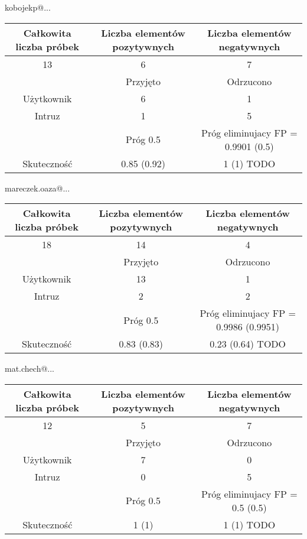 		kobojekp@... \\
		\begin{tabular}{|c|c|c|}
		\hline
		Całkowita liczba próbek & Liczba elementów pozytywnych & Liczba elementów negatywnych \\ \hline
			    	  13  & 6             & 7 \\ \hline
						    & Przyjęto   & Odrzucono \\ \hline
		Użytkownik  & 6             & 1 \\ \hline
		Intruz		    & 1             & 5 \\ \hline
						    & Próg 0.5  	& Próg eliminujacy FP = 0.9901 (0.5) \\ \hline
		Skuteczność & 0.85 (0.92)       & 1 (1) TODO\\ \hline
		\end{tabular}

		mareczek.oaza@... \\
		\begin{tabular}{|c|c|c|}
		\hline
		Całkowita liczba próbek & Liczba elementów pozytywnych & Liczba elementów negatywnych \\ \hline
			    	  18  & 14             & 4 \\ \hline
						    & Przyjęto   & Odrzucono \\ \hline
		Użytkownik  & 13             & 1 \\ \hline
		Intruz		    & 2             & 2 \\ \hline
						    & Próg 0.5  	& Próg eliminujacy FP = 0.9986 (0.9951) \\ \hline
		Skuteczność & 0.83 (0.83)       & 0.23 (0.64) TODO\\ \hline
		\end{tabular}

		mat.chech@... \\
		\begin{tabular}{|c|c|c|}
		\hline
		Całkowita liczba próbek & Liczba elementów pozytywnych & Liczba elementów negatywnych \\ \hline
			    	  12  & 5             & 7 \\ \hline
						    & Przyjęto   & Odrzucono \\ \hline
		Użytkownik  & 7             & 0 \\ \hline
		Intruz		    & 0             & 5 \\ \hline
						    & Próg 0.5  	& Próg eliminujacy FP = 0.5 (0.5) \\ \hline
		Skuteczność & 1 (1)       & 1 (1) TODO\\ \hline
		\end{tabular}

